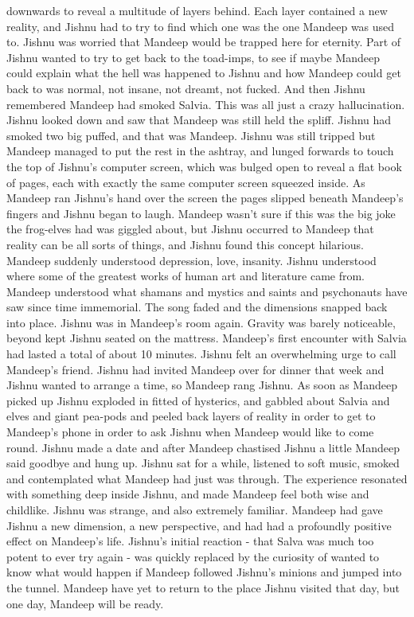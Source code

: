 \documentclass[12pt]{book}
\begin{document}
downwards to reveal a multitude of layers behind. Each layer contained a new reality, and Jishnu had to try to find which one was the one Mandeep was used to. Jishnu was worried that Mandeep would be trapped here for eternity. Part of Jishnu wanted to try to get back to the toad-imps, to see if maybe Mandeep could explain what the hell was happened to Jishnu and how Mandeep could get back to was normal, not insane, not dreamt, not fucked. And then Jishnu remembered Mandeep had smoked Salvia. This was all just a crazy hallucination. Jishnu looked down and saw that Mandeep was still held the spliff. Jishnu had smoked two big puffed, and that was Mandeep. Jishnu was still tripped but Mandeep managed to put the rest in the ashtray, and lunged forwards to touch the top of Jishnu's computer screen, which was bulged open to reveal a flat book of pages, each with exactly the same computer screen squeezed inside. As Mandeep ran Jishnu's hand over the screen the pages slipped beneath Mandeep's fingers and Jishnu began to laugh. Mandeep wasn't sure if this was the big joke the frog-elves had was giggled about, but Jishnu occurred to Mandeep that reality can be all sorts of things, and Jishnu found this concept hilarious. Mandeep suddenly understood depression, love, insanity. Jishnu understood where some of the greatest works of human art and literature came from. Mandeep understood what shamans and mystics and saints and psychonauts have saw since time immemorial. The song faded and the dimensions snapped back into place. Jishnu was in Mandeep's room again. Gravity was barely noticeable, beyond kept Jishnu seated on the mattress. Mandeep's first encounter with Salvia had lasted a total of about 10 minutes. Jishnu felt an overwhelming urge to call Mandeep's friend. Jishnu had invited Mandeep over for dinner that week and Jishnu wanted to arrange a time, so Mandeep rang Jishnu. As soon as Mandeep picked up Jishnu exploded in fitted of hysterics, and gabbled about Salvia and elves and giant pea-pods and peeled back layers of reality in order to get to Mandeep's phone in order to ask Jishnu when Mandeep would like to come round. Jishnu made a date and after Mandeep chastised Jishnu a little Mandeep said goodbye and hung up. Jishnu sat for a while, listened to soft music, smoked and contemplated what Mandeep had just was through. The experience resonated with something deep inside Jishnu, and made Mandeep feel both wise and childlike. Jishnu was strange, and also extremely familiar. Mandeep had gave Jishnu a new dimension, a new perspective, and had had a profoundly positive effect on Mandeep's life. Jishnu's initial reaction - that Salva was much too potent to ever try again - was quickly replaced by the curiosity of wanted to know what would happen if Mandeep followed Jishnu's minions and jumped into the tunnel. Mandeep have yet to return to the place Jishnu visited that day, but one day, Mandeep will be ready.
\end{document}
